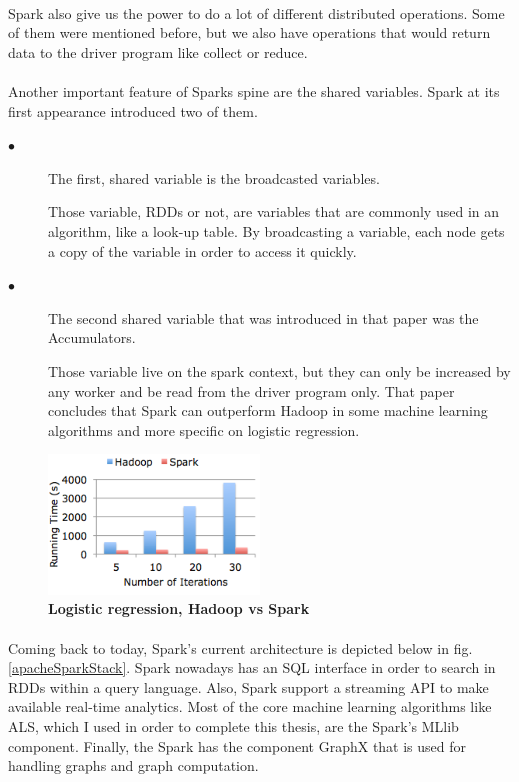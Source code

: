 \paragraph{}Spark also give us the power to do a lot of different distributed operations. Some of them were mentioned before, but we also have operations that would return data to the driver program like collect or reduce. 

\paragraph{} Another important feature of Sparks spine are the shared variables. Spark at its first appearance introduced two of them. 
\begin{description}
	\item[$\bullet$] The first, shared variable is the broadcasted variables. 
	
	Those variable, RDDs or not, are variables that are commonly used in an algorithm, like a look-up table. By broadcasting a variable, each node gets a copy of the variable in order to access it quickly. 
	
	\item[$\bullet$] The second shared variable that was introduced in that paper was the Accumulators. 
	
	Those variable live on the spark context, but they can only be increased by any worker and be read from the driver program only. That paper concludes that Spark can outperform Hadoop in some machine learning algorithms and more specific on logistic regression.
\end{description}

\begin{figure}[ht]
	\centering
	\includegraphics[width=0.5\textwidth]{../images/hadoopVsSpark.png}
	\caption{\bfseries Logistic regression, Hadoop vs Spark \cite{HadoopVsSpark}}
	\label{hadoopVsSpark}
\end{figure}

\paragraph{}Coming back to today, Spark's current architecture is depicted below in fig. \ref{apacheSparkStack}. Spark nowadays has an SQL interface in order to search in RDDs within a query language. Also, Spark support a streaming API to make available real-time analytics. Most of the core machine learning algorithms like ALS, which I used in order to complete this thesis, are the Spark's MLlib component. Finally, the Spark has the component GraphX that is used for handling graphs and graph computation.

